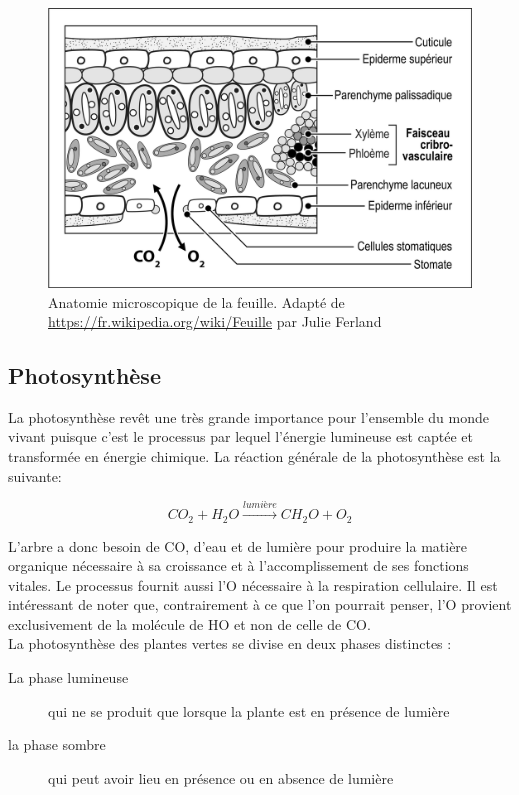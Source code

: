 \begin{figure}[h]
\centering
\includegraphics[scale=0.5]{img/ch2_feuille_coupe}
\caption{Anatomie microscopique de la feuille. Adapté de \url{https://fr.wikipedia.org/wiki/Feuille} par Julie Ferland}
\label{feuille_coupe}
\end{figure}

\subsection{Photosynthèse} 

La photosynthèse revêt une très grande importance pour l'ensemble du monde vivant puisque c'est le processus par lequel l'énergie lumineuse est captée et transformée en énergie chimique. La réaction générale de la photosynthèse est la suivante: 

\[CO_2 + H_2O \overset{lumière}{\longrightarrow} CH_2O + O_2\]

L'arbre a donc besoin de CO, d'eau et de lumière pour produire la matière organique nécessaire à sa croissance et à l'accomplissement de ses fonctions vitales. Le processus fournit aussi l'O nécessaire à la respiration cellulaire. Il est intéressant de noter que, contrairement à ce que l'on pourrait penser, l'O provient exclusivement de la molécule de HO et non de celle de CO.\\

La photosynthèse des plantes vertes se divise en deux phases distinctes :  
\begin{description}
\item[La phase lumineuse] qui ne se produit que lorsque la plante est en présence de lumière
\item[la phase sombre] qui peut avoir lieu en présence ou en absence de lumière
\end{description}

